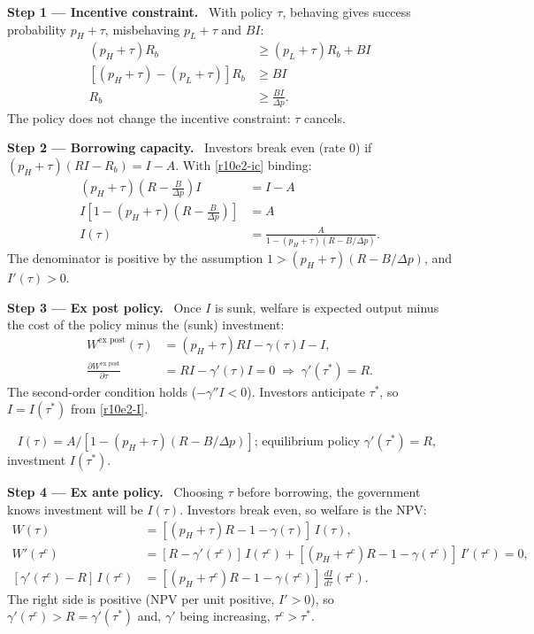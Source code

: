 \documentclass[11pt,a4paper]{article}
\newcommand{\step}[2]{\par\medskip\noindent\textbf{Step #1 --- #2.}~}
\newcommand{\answer}[1]{\par\smallskip\noindent\fbox{\textbf{Answer\if\relax\detokenize{#1}\relax\else\ #1\fi.}}~}
\begin{document}
\step{1}{Incentive constraint} With policy $\tau$, behaving gives success probability $p_H+\tau$, misbehaving $p_L+\tau$ and $BI$:
\begin{align}
  (p_H+\tau)R_b &\geq (p_L+\tau)R_b+BI \nonumber\\
  [(p_H+\tau)-(p_L+\tau)]R_b &\geq BI \nonumber\\
  R_b &\geq \frac{BI}{\Delta p}. \label{r10e2-ic}
\end{align}
The policy does not change the incentive constraint: $\tau$ cancels.

\step{2}{Borrowing capacity} Investors break even (rate 0) if $(p_H+\tau)(RI-R_b)=I-A$. With \eqref{r10e2-ic} binding:
\begin{align}
  (p_H+\tau)\left(R-\frac{B}{\Delta p}\right)I &= I-A \nonumber\\
  I\left[1-(p_H+\tau)\left(R-\frac{B}{\Delta p}\right)\right] &= A \nonumber\\
  I(\tau) &= \frac{A}{1-(p_H+\tau)(R-B/\Delta p)}. \label{r10e2-I}
\end{align}
The denominator is positive by the assumption $1>(p_H+\tau)(R-B/\Delta p)$, and $I'(\tau)>0$.

\step{3}{Ex post policy} Once $I$ is sunk, welfare is expected output minus the cost of the policy minus the (sunk) investment:
\begin{align}
  W^{\text{ex post}}(\tau) &= (p_H+\tau)RI-\gamma(\tau)I-I, \label{r10e2-Wexpost}\\
  \frac{\partial W^{\text{ex post}}}{\partial\tau} &= RI-\gamma'(\tau)I = 0 \;\Longrightarrow\; \gamma'(\tau^*)=R. \label{r10e2-tau}
\end{align}
The second-order condition holds ($-\gamma''I<0$). Investors anticipate $\tau^*$, so $I=I(\tau^*)$ from \eqref{r10e2-I}.

\answer{(i)} $I(\tau)=A/[1-(p_H+\tau)(R-B/\Delta p)]$; equilibrium policy $\gamma'(\tau^*)=R$, investment $I(\tau^*)$.

\step{4}{Ex ante policy} Choosing $\tau$ before borrowing, the government knows investment will be $I(\tau)$. Investors break even, so welfare is the NPV:
\begin{align}
  W(\tau) &= [(p_H+\tau)R-1-\gamma(\tau)]\,I(\tau), \label{r10e2-W}\\
  W'(\tau^c) &= [R-\gamma'(\tau^c)]\,I(\tau^c)+[(p_H+\tau^c)R-1-\gamma(\tau^c)]\,I'(\tau^c)=0, \nonumber\\
  [\gamma'(\tau^c)-R]\,I(\tau^c) &= [(p_H+\tau^c)R-1-\gamma(\tau^c)]\,\frac{dI}{d\tau}(\tau^c). \label{r10e2-tauc}
\end{align}
The right side is positive (NPV per unit positive, $I'>0$), so $\gamma'(\tau^c)>R=\gamma'(\tau^*)$ and, $\gamma'$ being increasing, $\tau^c>\tau^*$.
\end{document}
